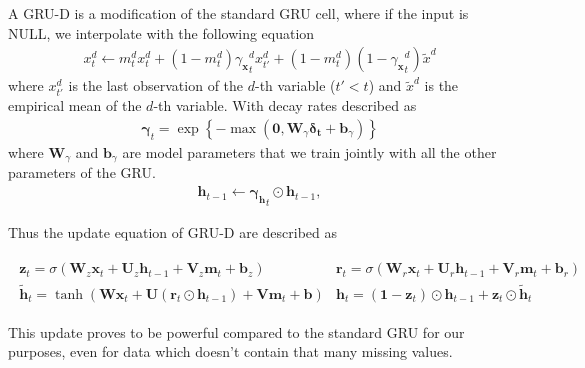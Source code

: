 \documentclass{article} %
\newcommand{\vct}[1]{\boldsymbol{#1}}
\newcommand{\mat}[1]{\boldsymbol{#1}}
\begin{document}
A GRU-D is a modification of the standard GRU cell, where if the input is NULL, we interpolate with the following equation
\begin{align}
  \label{eq:decay-input}
  x_t^d \leftarrow m_t^d x_t^d + (1-m_t^d) {\gamma_{\vct{x}}}_t^d x^d_{t'} + (1-m_t^d) (1-{\gamma_{\vct{x}}}_t^d)\tilde{x}^d
\end{align}
where $x^d_{t'}$ is the last observation of the $d$-th variable ($t'<t$) and $ \tilde{x}^d $ is the empirical mean of the $d$-th variable. With decay rates described as
\begin{align}
  \label{eq:decay-term}
  \mat{\gamma}_t = \exp\left\{-\max \left( \vct{0}, \mat{W}_{\gamma} \vct{\delta_t} +
  \vct{b}_{\gamma} \right)\right\}
\end{align}
where $\mat{W}_{\gamma}$ and $\vct{b}_{\gamma}$ are model parameters that we train jointly with all the other parameters of the GRU.
\begin{align}
\label{eq:decay-hidden}
    \vct{h}_{t-1} \leftarrow {\vct{\gamma}_{\vct{h}}}_t \odot \vct{h}_{t-1},
\end{align}

Thus the update equation of GRU-D are described as

\begin{align*}
  \begin{array}{ll}
  \vct{z}_t = \sigma \left( \mat{W}_z \vct{x}_t + \mat{U}_z \vct{h}_{t-1} + \mat{V}_z \vct{m}_t + \vct{b}_z \right)
  & \vct{r}_t = \sigma \left( \mat{W}_r \vct{x}_t + \mat{U}_r \vct{h}_{t-1} + \mat{V}_r \vct{m}_t+
  \vct{b}_r \right) \\
  \tilde{\vct{h}}_t = \tanh \left( \mat{W} \vct{x}_t + \mat{U} (\vct{r}_t \odot \vct{h}_{t-1})  + \mat{V} \vct{m}_t + \vct{b} \right)
  & \vct{h}_t = (\vct{1}-\vct{z}_t) \odot \vct{h}_{t-1} + \vct{z}_t \odot \tilde{\vct{h}}_t
  \end{array}
\end{align*}

This update proves to be powerful compared to the standard GRU for our purposes, even for data which doesn't  contain that many missing values.
\end{document}
